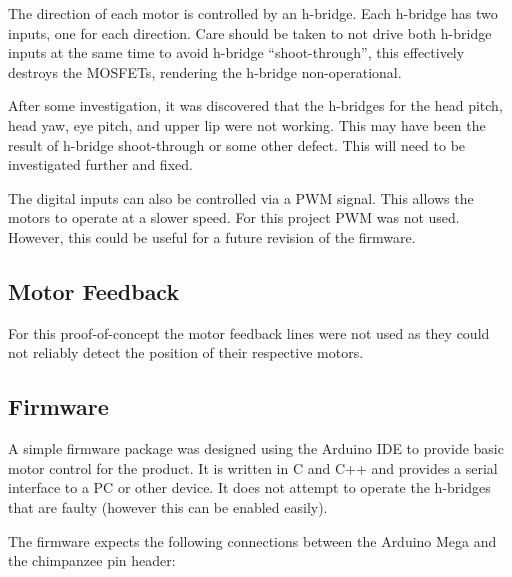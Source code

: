 \documentclass[11pt]{article} %
\begin{document}
The direction of each motor is controlled by an h-bridge.
Each h-bridge has two inputs, one for each direction.
Care should be taken to not drive both h-bridge inputs at the same time to avoid h-bridge ``shoot-through'', this effectively destroys the MOSFETs, rendering the h-bridge non-operational.

After some investigation, it was discovered that the h-bridges for the head pitch, head yaw, eye pitch, and upper lip were not working.
This may have been the result of h-bridge shoot-through or some other defect.
This will need to be investigated further and fixed.

The digital inputs can also be controlled via a PWM signal.
This allows the motors to operate at a slower speed.
For this project PWM was not used.
However, this could be useful for a future revision of the firmware.

\subsection{Motor Feedback}

For this proof-of-concept the motor feedback lines were not used as they could not reliably detect the position of their respective motors.

\subsection{Firmware}

A simple firmware package was designed using the Arduino IDE to provide basic motor control for the product.
It is written in C and C++ and provides a serial interface to a PC or other device. 
It does not attempt to operate the h-bridges that are faulty (however this can be enabled easily).

The firmware expects the following connections between the Arduino Mega and the chimpanzee pin header:
\end{document}

